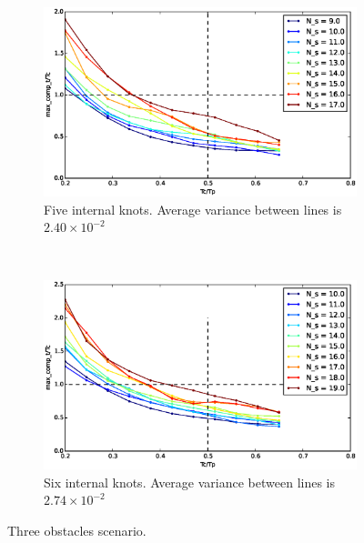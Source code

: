 \begin{figure}[!h]
        ~ %
        \begin{subfigure}[b]{0.48\textwidth}
                \includegraphics[width=\textwidth]{./img/realtime/Scenario_3__N_knots_5/mcttc-tctp.eps}
                \caption{Five internal knots. Average variance between lines is $2.40\times 10^{-2}$}\label{fig:uni35}
        \end{subfigure}
        ~ %
        \begin{subfigure}[b]{0.48\textwidth}
                \includegraphics[width=\textwidth]{./img/realtime/Scenario_3__N_knots_6/mcttc-tctp.eps}
                \caption{Six internal knots. Average variance between lines is $2.74\times 10^{-2}$}\label{fig:uni36}
        \end{subfigure}
        \caption{Three obstacles scenario.}\label{fig:uni3}
\end{figure}

